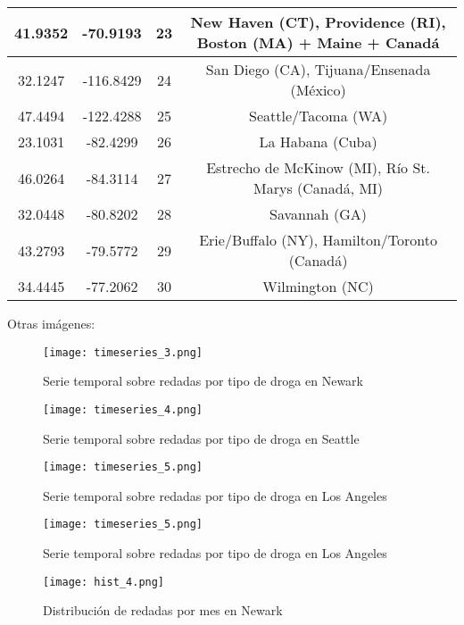 \documentclass[12pt]{article}
\begin{document}
\begin{table}[H]
\begin{tabular}{|c|c|c|c|}
		\hline
		41.9352 & -70.9193 & 23  & New Haven (CT), Providence (RI), Boston (MA) + Maine + Canadá \\
		\hline
		32.1247 & -116.8429 & 24  & San Diego (CA), Tijuana/Ensenada (México) \\
		\hline
		47.4494 & -122.4288 & 25  & Seattle/Tacoma (WA) \\
		\hline
		23.1031 & -82.4299 & 26  & La Habana (Cuba) \\
		\hline
		46.0264 & -84.3114 & 27  & Estrecho de McKinow (MI), Río St. Marys (Canadá, MI) \\
		\hline
		32.0448 & -80.8202 & 28  & Savannah (GA) \\
		\hline
		43.2793 & -79.5772 & 29  & Erie/Buffalo (NY), Hamilton/Toronto (Canadá) \\
		\hline
		34.4445 & -77.2062 & 30  & Wilmington (NC) \\
		\hline
	\end{tabular}
\end{table}


Otras imágenes:

\begin{figure}[H]
	\caption{\label{timeseries_3} Serie temporal sobre redadas por tipo de droga en Newark}
	\centering
	\hspace*{1cm}
	\texttt{[image: timeseries\_3.png]}
\end{figure}

\begin{figure}[H]
	\caption{\label{timeseries_4} Serie temporal sobre redadas por tipo de droga en Seattle}
	\centering
	\hspace*{1cm}
	\texttt{[image: timeseries\_4.png]}
\end{figure}

\begin{figure}[H]
	\caption{\label{timeseries_5} Serie temporal sobre redadas por tipo de droga en Los Angeles}
	\centering
	\hspace*{1cm}
	\texttt{[image: timeseries\_5.png]}
\end{figure}

\begin{figure}[H]
	\caption{\label{timeseries_5} Serie temporal sobre redadas por tipo de droga en Los Angeles}
	\centering
	\hspace*{1cm}
	\texttt{[image: timeseries\_5.png]}
\end{figure}

\begin{figure}[H]
	\caption{\label{hist_4} Distribución de redadas por mes en Newark}
	\centering
	\hspace*{1cm}
	\texttt{[image: hist\_4.png]}
\end{figure}
\end{document}
